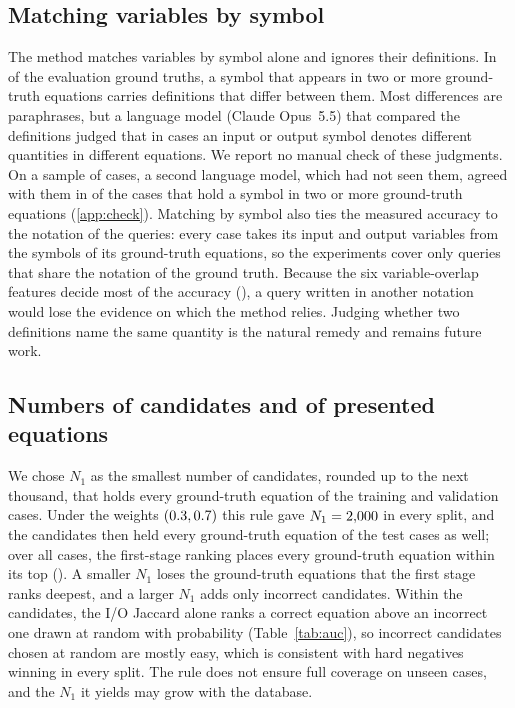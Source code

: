 \subsection{Matching variables by symbol}\label{sec:symbols}

The method matches variables by symbol alone and ignores their definitions. In \NSymbolCases{} of
the \NCases{} evaluation ground truths, a symbol that appears in two or more ground-truth equations
carries definitions that differ between them. Most differences are paraphrases, but a language
model (Claude Opus~5.5) that compared the definitions judged that in \NMeaningCases{} cases an input
or output symbol denotes different quantities in different equations.
We report no manual check of these judgments. On a sample of cases, a second language model, which
had not seen them, agreed with them in \NCheckFlagAgree{} of the \NCheckThreeApplicable{} cases that
hold a symbol in two or more ground-truth equations (\ref{app:check}).
Matching by symbol also ties the measured accuracy to the notation of the queries: every case takes
its input and output variables from the symbols of its ground-truth equations, so the experiments
cover only queries that share the notation of the ground truth. Because the six variable-overlap
features decide most of the accuracy (), a query written in another
notation would lose the evidence on which the method relies. Judging whether two definitions name
the same quantity \citep{ProcessBERT} is the natural remedy and remains future work.

\subsection{Numbers of candidates and of presented equations}\label{sec:nonediscussion}

We chose $N_1$ as the smallest number of candidates, rounded up to the next thousand, that holds
every ground-truth equation of the training and validation cases. Under the weights
$(0.3, 0.7)$ this rule gave $N_1 = 2{,}000$ in every split, and the candidates then held every
ground-truth equation of the test cases as well; over all \NCases{} cases, the first-stage ranking
places every ground-truth equation within its top \NOneAllGt{}
(). A smaller $N_1$ loses the ground-truth equations that the first
stage ranks deepest, and a larger $N_1$ adds only incorrect candidates. Within the candidates, the
I/O Jaccard alone ranks a correct equation above an incorrect one drawn at random with probability
\AucCandIoJac{} (Table~\ref{tab:auc}), so incorrect candidates chosen at random are mostly easy,
which is consistent with hard negatives winning in every split. The rule does not ensure full
coverage on unseen cases, and the $N_1$ it yields may grow with the database.

